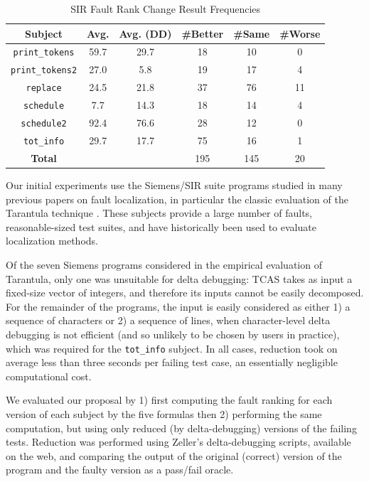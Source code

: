 \begin{table}
\begin{center}
\begin{tabular}{|c||c|c|c|c|c|}
\hline
\hline

\hline
Subject & Avg. & Avg. (DD) & \#Better & \#Same & \#Worse \\
\hline
\hline
{\tt print\_tokens} & 59.7 & 29.7 & 18 & 10 & 0  \\
\hline
{\tt print\_tokens2} & 27.0 & 5.8 & 19 & 17 & 4  \\
\hline
{\tt replace} & 24.5 & 21.8 & 37 & 76 & 11  \\
\hline
{\tt schedule} & 7.7 & 14.3 & 18 & 14 & 4  \\
\hline
{\tt schedule2} & 92.4 & 76.6 & 28 & 12 & 0 \\ 
\hline
{\tt tot\_info} & 29.7 & 17.7 & 75 & 16 & 1 \\
\hline
\hline
{\bf Total} & & & 195 & 145 & 20  \\
\hline
\hline
\end{tabular}
\end{center}
\caption{SIR Fault Rank Change Result Frequencies}
\label{tab:avgimproved}
\end{table}

Our initial experiments use the Siemens/SIR \cite{doESE05,Siemens}
suite programs studied in many previous papers on fault localization,
in particular the classic evaluation of the Tarantula technique
\cite{Tarantula}.  These subjects provide a large number of faults,
reasonable-sized test suites, and have historically been used to
evaluate localization methods.

Of the seven Siemens programs considered in the empirical evaluation
of Tarantula, only one was unsuitable for delta debugging: TCAS takes
as input a fixed-size vector of integers, and therefore its inputs
cannot be easily decomposed.  For the remainder of the programs, the
input is easily considered as either 1) a sequence of characters or 2)
a sequence of lines, when character-level delta debugging is not
efficient (and so unlikely to be chosen by users in practice), which
was required for the {\tt tot\_info} subject.  In all cases, reduction
took on average less than three seconds per failing test case, an essentially
negligible computational cost.



We evaluated our proposal by 1) first computing the fault ranking for
each version of each subject by the five formulas then 2) performing
the same computation, but using only reduced (by delta-debugging)
versions of the failing tests.  Reduction was performed using Zeller's
delta-debugging scripts, available on the web, and comparing the output
of the original (correct) version of the program and the faulty
version as a pass/fail oracle.

